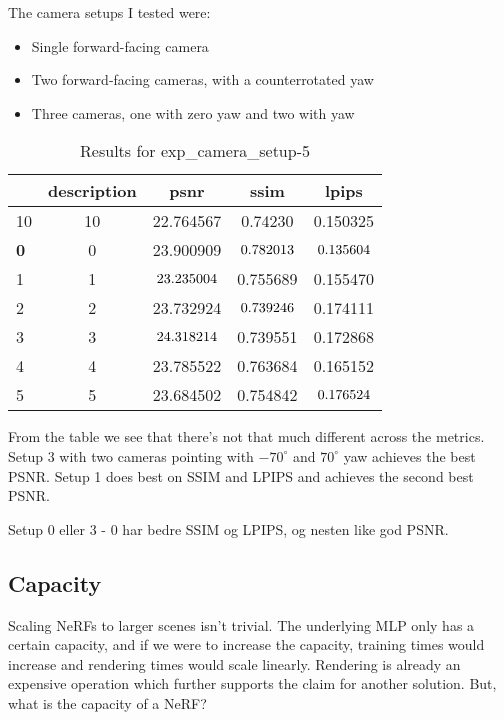 The camera setups I tested were:
\begin{itemize}
    \item Single forward-facing camera
    \item Two forward-facing cameras, with a counterrotated yaw
    \item Three cameras, one with zero yaw and two with yaw
\end{itemize}

\begin{table}[ht]
\centering
\begin{tabular}{|l|c|c|c|c|}
\hline
& description & psnr & ssim & lpips \\
\hline
10 & 10 & 22.764567 & 0.74230 & 0.150325 \\
\cline{1-5}
\textbf{0} & 0 & 23.900909 & $\cellcolor{green} 0.782013$ & $\cellcolor{green} 0.135604$ \\
\cline{1-5}
1 & 1 & $\cellcolor{red} 23.235004$ & 0.755689 & 0.155470 \\
\cline{1-5}
2 & 2 & 23.732924 & $\cellcolor{red} 0.739246$ & 0.174111 \\
\cline{1-5}
3 & 3 & $\cellcolor{green} 24.318214$ & 0.739551 & 0.172868 \\
\cline{1-5}
4 & 4 & 23.785522 & 0.763684 & 0.165152 \\
\cline{1-5}
5 & 5 & 23.684502 & 0.754842 & $\cellcolor{red} 0.176524$ \\
\cline{1-5}
\end{tabular}
\caption{Results for exp\_camera\_setup-5}
\label{tab:exp_camera_setup-5}
\end{table}

From the table we see that there's not that much different across the metrics. Setup 3 with two cameras pointing with $-70^\circ$ and $70^\circ$ yaw achieves the best PSNR. Setup 1 does best on SSIM and LPIPS and achieves the second best PSNR.

Setup 0 eller 3
- 0 har bedre SSIM og LPIPS, og nesten like god PSNR.

\subsection{Capacity}
Scaling NeRFs to larger scenes isn’t trivial. The underlying MLP only has a certain capacity, and if we were to increase the capacity, training times would increase and rendering times would scale linearly. Rendering is already an expensive operation which further supports the claim for another solution. But, what is the capacity of a NeRF?

